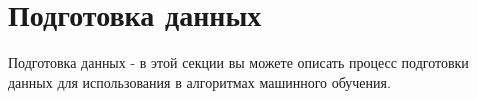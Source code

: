 


\section{Подготовка данных}\label{sec:data_preparation}
    Подготовка данных - в этой секции вы можете описать процесс подготовки данных для использования в алгоритмах машинного обучения.
